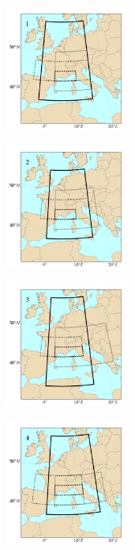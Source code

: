 \documentclass[twocol]{ametsoc}
\begin{document}
\begin{figure}[htb]
	\centering
	\begin{subfigure}{.5\columnwidth}
		\centering
		\includegraphics[width=4.1cm]{figures/spatial_win_z4/Spatial_windows_1.png}
	\end{subfigure}%
	\begin{subfigure}{.5\columnwidth}
		\centering
		\includegraphics[width=4.1cm]{figures/spatial_win_z4/Spatial_windows_2.png}
	\end{subfigure}
	\begin{subfigure}{.5\columnwidth}
		\centering
		\includegraphics[width=4.1cm]{figures/spatial_win_z4/Spatial_windows_3.png}
	\end{subfigure}%
	\begin{subfigure}{.5\columnwidth}
		\centering
		\includegraphics[width=4.1cm]{figures/spatial_win_z4/Spatial_windows_4.png}

\end{subfigure}
\end{figure}
\end{document}
